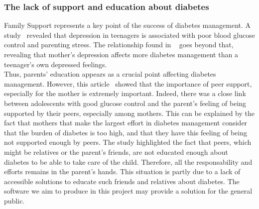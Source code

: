 



\subsubsection{The lack of support and education about diabetes}
Family Support represents a key point of the success of diabetes management. A study~\cite{maas2013interrelationships} revealed that depression in teenagers is associated with poor blood glucose control and parenting stress. The relationship found in ~\cite{clayton2013impact}  goes beyond that, revealing that mother's depression affects more diabetes management than a teenager's own depressed feelings.
\\Thus, parents' education appears as a crucial point affecting diabetes management. However, 
this article~\cite{familyFactors} showed that the importance of peer support, especially for the mother is extremely important. Indeed, there was a close link between adolescents with good glucose control and the parent's feeling of being supported by their peers, especially among mothers. This can be explained by the fact that mothers that make the largest effort in diabetes management consider that the burden of diabetes is too high, and that they have this feeling of being not supported enough by peers. The study highlighted the fact that peers, which might be relatives or the parent's friends, are not educated enough about diabetes to be able to take care of the child. Therefore, all the responsability and efforts remains in the parent's hands. This situation is partly due to a lack of accessible solutions to educate such friends and relatives about diabetes. The software we aim to produce in this project may provide a solution for the general public.\\
            

